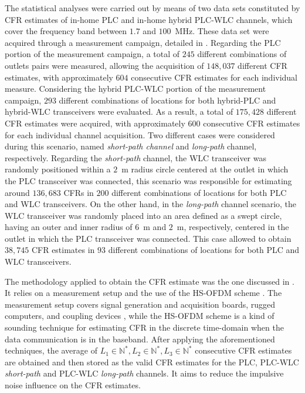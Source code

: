 \documentclass[journal]{IEEEtran}
\begin{document}
The statistical analyses were carried out by means of two data sets constituted by \ac{CFR} estimates of in-home \ac{PLC} and in-home hybrid \ac{PLC}-\ac{WLC} channels, which cover the frequency band between $1.7$ and $100$~MHz. These data set were acquired through a measurement campaign, detailed in \cite{Thiago:Characterization,thiago:hyb}. Regarding the \ac{PLC} portion of the measurement campaign, a total of $245$ different combinations of outlets pairs were measured, allowing the acquisition of $148,037$ different \ac{CFR} estimates, with approximately $604$ consecutive \ac{CFR} estimates for each individual measure. Considering the hybrid \ac{PLC}-\ac{WLC} portion of the measurement campaign, $293$ different combinations of locations for both hybrid-\ac{PLC} and hybrid-\ac{WLC} transceivers were evaluated. As a result, a total of $175,428$ different \ac{CFR} estimates were acquired, with approximately $600$ consecutive \ac{CFR} estimates for each individual channel acquisition. Two different cases were considered during this scenario, named \textit{short-path channel} and \textit{long-path} channel, respectively. Regarding the \textit{short-path} channel, the \ac{WLC} transceiver was randomly positioned within a $2$~m radius circle centered at the outlet in which the \ac{PLC} transceiver was connected, this scenario was responsible for estimating around $136,683$ \acp{CFR} in $200$ different combinations of locations for both \ac{PLC} and \ac{WLC} transceivers. On the other hand, in the \textit{long-path} channel scenario, the \ac{WLC} transceiver was randomly placed into an area defined as a swept circle, having an outer and inner radius of $6$~m and $2$~m, respectively, centered in the outlet in which the \ac{PLC} transceiver was connected. This case allowed to obtain $38,745$ \ac{CFR} estimates in $93$ different combinations of locations for both \ac{PLC} and \ac{WLC} transceivers.

The methodology applied to obtain the \ac{CFR} estimate was the one discussed in \cite{Thiago:FR}. It relies on a measurement setup and the use of the \ac{HS-OFDM} scheme \cite{HSOFDM,Picorone}. The measurement setup covers signal generation and acquisition boards, rugged computers, and coupling devices \cite{Luis:AI,Coupling:PLC}, while the \ac{HS-OFDM} scheme is a kind of sounding technique for estimating \ac{CFR} in the discrete time-domain when the data communication is in the baseband. After applying the aforementioned techniques, the average of $L_1\in \mathbb{N}^*, L_2\in \mathbb{N}^*, L_3\in \mathbb{N}^* $ consecutive \ac{CFR} estimates are obtained and then stored as the valid \ac{CFR} estimates for the \ac{PLC}, \ac{PLC}-\ac{WLC} \textit{short-path} and \ac{PLC}-\ac{WLC} \textit{long-path} channels. It aims to reduce the impulsive noise influence on the \ac{CFR} estimates.
\end{document}
